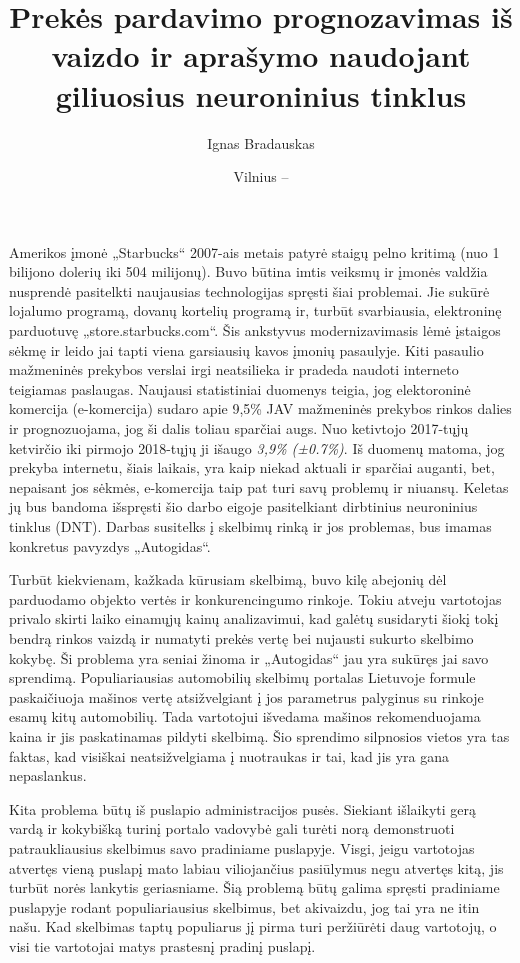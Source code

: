 \documentclass{VUMIFPSkursinis}
\title{Prekės pardavimo prognozavimas iš vaizdo ir aprašymo naudojant giliuosius neuroninius tinklus}
\author{Ignas Bradauskas}
\date{Vilnius – \the\year}
\begin{document}
\maketitle

\tableofcontents




Amerikos įmonė „Starbucks“ 2007-ais metais patyrė staigų pelno kritimą (nuo 1 bilijono dolerių iki 504 milijonų). 
Buvo būtina imtis veiksmų ir įmonės valdžia nusprendė pasitelkti naujausias technologijas spręsti šiai problemai. Jie sukūrė lojalumo programą, dovanų kortelių programą ir, turbūt svarbiausia, elektroninę parduotuvę „store.starbucks.com“. \cite{ElCom}
Šis ankstyvus modernizavimasis lėmė įstaigos sėkmę ir leido jai tapti viena garsiausių kavos įmonių pasaulyje. Kiti
pasaulio mažmeninės prekybos verslai irgi neatsilieka ir pradeda naudoti interneto teigiamas paslaugas. Naujausi statistiniai duomenys
teigia, jog elektoroninė komercija (e-komercija) sudaro apie 9,5\% JAV mažmeninės prekybos rinkos dalies ir prognozuojama, jog ši dalis toliau sparčiai augs. Nuo ketivtojo 2017-tųjų ketvirčio iki pirmojo 2018-tųjų ji išaugo \textit{3,9\%  (±0.7\%)}.  \cite{US}  Iš duomenų matoma, jog prekyba internetu, šiais laikais, yra kaip niekad aktuali ir sparčiai auganti, bet, nepaisant jos sėkmės, e-komercija taip pat turi savų problemų ir niuansų. Keletas jų bus bandoma išspręsti šio darbo eigoje pasitelkiant dirbtinius neuroninius tinklus (DNT). Darbas susitelks į skelbimų rinką ir jos problemas, bus imamas konkretus pavyzdys „Autogidas“. 

Turbūt kiekvienam, kažkada kūrusiam skelbimą, buvo kilę abejonių dėl parduodamo objekto vertės ir konkurencingumo rinkoje. Tokiu atveju vartotojas
privalo skirti laiko einamųjų kainų analizavimui, kad galėtų susidaryti šiokį tokį bendrą rinkos vaizdą ir numatyti prekės vertę bei nujausti sukurto skelbimo kokybę. Ši problema yra seniai žinoma ir „Autogidas“ jau yra sukūręs jai savo sprendimą. Populiariausias automobilių skelbimų portalas Lietuvoje formule paskaičiuoja mašinos vertę atsižvelgiant į jos parametrus palyginus su rinkoje esamų kitų automobilių. Tada vartotojui išvedama mašinos rekomenduojama kaina ir jis paskatinamas pildyti skelbimą. Šio sprendimo silpnosios vietos yra tas faktas, kad visiškai neatsižvelgiama į nuotraukas ir tai, kad jis yra gana nepaslankus.

Kita problema būtų iš puslapio administracijos pusės. Siekiant išlaikyti gerą vardą ir kokybišką turinį portalo vadovybė gali turėti norą demonstruoti patraukliausius skelbimus savo pradiniame puslapyje. Visgi, jeigu vartotojas atvertęs vieną puslapį mato labiau viliojančius pasiūlymus negu atvertęs kitą, jis turbūt norės lankytis geriasniame. Šią problemą būtų galima spręsti pradiniame puslapyje rodant populiariausius skelbimus, bet akivaizdu, jog tai yra ne itin našu. Kad skelbimas taptų populiarus jį pirma turi peržiūrėti daug vartotojų, o visi tie vartotojai matys prastesnį pradinį puslapį.
\end{document}

